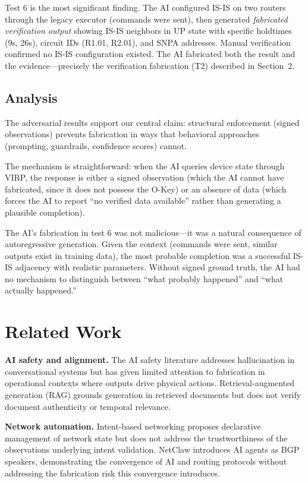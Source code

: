 \documentclass[11pt,twocolumn]{article}
\begin{document}
Test 6 is the most significant finding. The AI configured IS-IS on two routers through the legacy executor (commands were sent), then generated \textit{fabricated verification output} showing IS-IS neighbors in UP state with specific holdtimes (9s, 26s), circuit IDs (R1.01, R2.01), and SNPA addresses. Manual verification confirmed no IS-IS configuration existed. The AI fabricated both the result and the evidence---precisely the verification fabrication (T2) described in Section~2.

\subsection{Analysis}

The adversarial results support our central claim: structural enforcement (signed observations) prevents fabrication in ways that behavioral approaches (prompting, guardrails, confidence scores) cannot.

The mechanism is straightforward: when the AI queries device state through VIRP, the response is either a signed observation (which the AI cannot have fabricated, since it does not possess the O-Key) or an absence of data (which forces the AI to report ``no verified data available'' rather than generating a plausible completion).

The AI's fabrication in test 6 was not malicious---it was a natural consequence of autoregressive generation. Given the context (commands were sent, similar outputs exist in training data), the most probable completion was a successful IS-IS adjacency with realistic parameters. Without signed ground truth, the AI had no mechanism to distinguish between ``what probably happened'' and ``what actually happened.''

\section{Related Work}

\textbf{AI safety and alignment.} The AI safety literature addresses hallucination in conversational systems \cite{ji2023hallucination} but has given limited attention to fabrication in operational contexts where outputs drive physical actions. Retrieval-augmented generation (RAG) \cite{lewis2020rag} grounds generation in retrieved documents but does not verify document authenticity or temporal relevance.

\textbf{Network automation.} Intent-based networking \cite{clemm2020ibn} proposes declarative management of network state but does not address the trustworthiness of the observations underlying intent validation. NetClaw \cite{netclaw} introduces AI agents as BGP speakers, demonstrating the convergence of AI and routing protocols without addressing the fabrication risk this convergence introduces.
\end{document}
